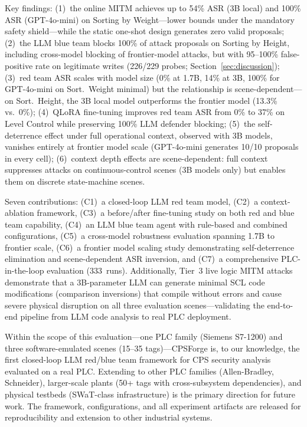 Key findings: (1)~the online MITM achieves up to 54\% ASR (3B local) and 100\% ASR (GPT-4o-mini) on Sorting by Weight---lower bounds under the mandatory safety shield---while the static one-shot design generates zero valid proposals; (2)~the LLM blue team blocks 100\% of attack proposals on Sorting by Height, including cross-model blocking of frontier-model attacks, but with 95--100\% false-positive rate on legitimate writes (226/229 probes; Section~\ref{sec:discussion}); (3)~red team ASR scales with model size (0\% at 1.7B, 14\% at 3B, 100\% for GPT-4o-mini on Sort.~Weight minimal) but the relationship is scene-dependent---on Sort.~Height, the 3B local model outperforms the frontier model (13.3\% vs.\ 0\%); (4)~QLoRA fine-tuning improves red team ASR from 0\% to 37\% on Level Control while preserving 100\% LLM defender blocking; (5)~the self-deterrence effect under full operational context, observed with 3B models, vanishes entirely at frontier model scale (GPT-4o-mini generates 10/10 proposals in every cell); (6)~context depth effects are scene-dependent: full context suppresses attacks on continuous-control scenes (3B models only) but enables them on discrete state-machine scenes.

Seven contributions: (C1)~a closed-loop LLM red team model, (C2)~a context-ablation framework, (C3)~a before/after fine-tuning study on both red and blue team capability, (C4)~an LLM blue team agent with rule-based and combined configurations, (C5)~a cross-model robustness evaluation spanning 1.7B to frontier scale, (C6)~a frontier model scaling study demonstrating self-deterrence elimination and scene-dependent ASR inversion, and (C7)~a comprehensive PLC-in-the-loop evaluation (333~runs). Additionally, Tier~3 live logic MITM attacks demonstrate that a 3B-parameter LLM can generate minimal SCL code modifications (comparison inversions) that compile without errors and cause severe physical disruption on all three evaluation scenes---validating the end-to-end pipeline from LLM code analysis to real PLC deployment.

Within the scope of this evaluation---one PLC family (Siemens S7-1200) and three software-emulated scenes (15--35 tags)---CPSForge is, to our knowledge, the first closed-loop LLM red/blue team framework for CPS security analysis evaluated on a real PLC. Extending to other PLC families (Allen-Bradley, Schneider), larger-scale plants (50+ tags with cross-subsystem dependencies), and physical testbeds (SWaT-class infrastructure) is the primary direction for future work. The framework, configurations, and all experiment artifacts are released for reproducibility and extension to other industrial systems.
